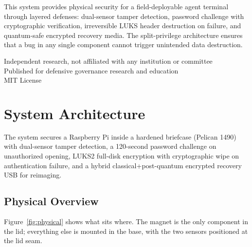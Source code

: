 \documentclass[11pt,letterpaper]{article}
\begin{document}
\begin{titlepage}
\vspace{1cm}

\begin{securitybox}
This system provides physical security for a field-deployable agent terminal through layered defenses: dual-sensor tamper detection, password challenge with cryptographic verification, irreversible LUKS header destruction on failure, and quantum-safe encrypted recovery media. The split-privilege architecture ensures that a bug in any single component cannot trigger unintended data destruction.
\end{securitybox}

\vfill

{\small\color{softslate}\sffamily
Independent research, not affiliated with any institution or committee\\
Published for defensive governance research and education\\
MIT License
}

\end{titlepage}

\tableofcontents
\newpage

\section{System Architecture}

The system secures a Raspberry Pi inside a hardened briefcase (Pelican 1490) with dual-sensor tamper detection, a 120-second password challenge on unauthorized opening, LUKS2 full-disk encryption with cryptographic wipe on authentication failure, and a hybrid classical+post-quantum encrypted recovery USB for reimaging.

\subsection{Physical Overview}

Figure~\ref{fig:physical} shows what sits where. The magnet is the only component in the lid; everything else is mounted in the base, with the two sensors positioned at the lid seam.
\end{document}
